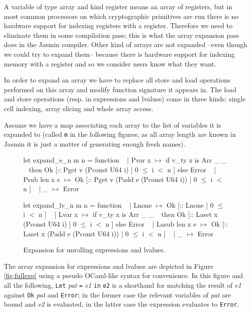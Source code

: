\documentclass{article}
\begin{document}
A variable of type array and kind register means an array of registers, but in
most common processors on which cryptographic primitives are run there is no
hardware support for indexing registers with a register. Therefore we need to
eliminate them in some compilation pass; this is what the array expansion pass
does in the Jasmin compiler. Other kind of arrays are not expanded --even though
we could try to expand them-- because there is hardware support for indexing
memory with a register and so we consider users know what they want.

In order to expand an array we have to replace all store and load operations
performed on this array and modify function signature it appears in. The load
and store operations (resp. in expressions and lvalues) come in three kinds:
single cell indexing, array slicing and whole array access.

\smallskip

Assume we have a map associating each array to the list of variables it is
expanded to (called \texttt{m} in the following figures; as all array length are
known in Jasmin it is just a matter of generating enough fresh names).

\medskip

\begin{figure}[t]
\obeylines\obeyspaces\ttfamily%
let expand\_e\_n m n = function
~ | Pvar x       \(\mapsto\) if v\_ty x is Arr \_ \_
~   then Ok [:: Pget v (Pconst U64 i) | 0 \(\leq\) i \(<\) n ] else Error
~ | Psub len x e \(\mapsto\) Ok [:: Pget v (Padd e (Pconst U64 i)) | 0 \(\leq\) i \(<\) n ]
~ | \_            \(\mapsto\) Error
 
let expand\_lv\_n m n = function
~ | Lnone         \(\mapsto\) Ok [:: Lnone | 0 \(\leq\) i \(<\) n ]
~ | Lvar x        \(\mapsto\) if v\_ty x is Arr \_ \_
~   then Ok [:: Laset x (Pconst U64 i) | 0 \(\leq\) i \(<\) n ] else Error
~ | Lasub len x e \(\mapsto\) Ok [:: Laset x (Padd e (Pconst U64 i)) | 0 \(\leq\) i \(<\) n ]
~ | \_             \(\mapsto\) Error
\normalfont%
\caption{Expansion for unrolling expressions and lvalues.}\label{fig:unrexp}
\end{figure}

The array expansion for expressions and lvalues are depicted in Figure
\ref{fig:fullexp} using a pseudo OCaml-like syntax for convenience.
In this figure and all the following, \texttt{Let} \textit{pat} \texttt{=}
\textit{e1} \texttt{in} \texttt{e2} is a shorthand for matching the result of
\textit{e1} against \texttt{Ok} \textit{pat} and \texttt{Error}; in the former
case the relevant variables of \textit{pat} are bound and \textit{e2} is
evaluated, in the latter case the expression evaluates to \texttt{Error}.
\end{document}
